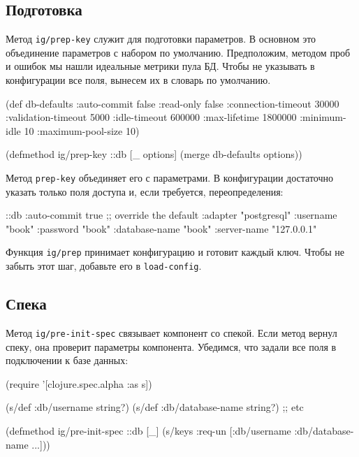 \subsection{Подготовка}

Метод \verb|ig/prep-key| служит для подготовки параметров. В основном это
объединение параметров с набором по умолчанию. Предположим, методом проб и
ошибок мы нашли идеальные метрики пула БД. Чтобы не указывать в конфигурации все
поля, вынесем их в словарь по умолчанию.

\begin{english}
  \begin{clojure}
(def db-defaults
  {:auto-commit        false
   :read-only          false
   :connection-timeout 30000
   :validation-timeout 5000
   :idle-timeout       600000
   :max-lifetime       1800000
   :minimum-idle       10
   :maximum-pool-size  10})

(defmethod ig/prep-key ::db
  [_ options]
  (merge db-defaults options))
  \end{clojure}
\end{english}

Метод \verb|prep-key| объединяет его с параметрами. В конфигурации достаточно
указать только поля доступа и, если требуется, переопределения:

\begin{english}
  \begin{clojure}
{::db {:auto-commit   true ;; override the default
       :adapter       "postgresql"
       :username      "book"
       :password      "book"
       :database-name "book"
       :server-name   "127.0.0.1"}}
  \end{clojure}
\end{english}

Функция \verb|ig/prep| принимает конфигурацию и готовит каждый ключ. Чтобы не
забыть этот шаг, добавьте его в \verb|load-config|.

\subsection{Спека}


Метод \verb|ig/pre-init-spec| связывает компонент со спекой. Если метод вернул
спеку, она проверит параметры компонента. Убедимся, что задали все поля в
подключении к базе данных:

\begin{english}
  \begin{clojure}
(require '[clojure.spec.alpha :as s])

(s/def :db/username string?)
(s/def :db/database-name string?)
;; etc

(defmethod ig/pre-init-spec ::db [_]
  (s/keys :req-un [:db/username
                   :db/database-name
                   ...]))
  \end{clojure}
\end{english}

